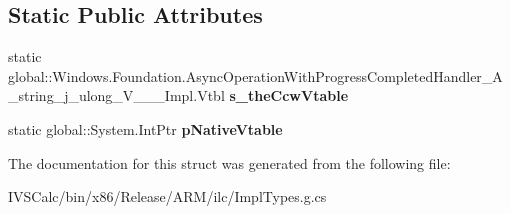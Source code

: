 \subsection*{Static Public Attributes}
\begin{DoxyCompactItemize}
\item 
\mbox{\label{struct_windows_1_1_foundation_1_1_async_operation_with_progress_completed_handler___a__string__j__ulong___v_______impl_1_1_vtbl_a6046ec4e0cf67387d4bfe825d541a234}} 
static global\+::\+Windows.\+Foundation.\+Async\+Operation\+With\+Progress\+Completed\+Handler\+\_\+\+A\+\_\+string\+\_\+j\+\_\+ulong\+\_\+\+V\+\_\+\+\_\+\+\_\+\+Impl.\+Vtbl {\bfseries s\+\_\+the\+Ccw\+Vtable}
\item 
\mbox{\label{struct_windows_1_1_foundation_1_1_async_operation_with_progress_completed_handler___a__string__j__ulong___v_______impl_1_1_vtbl_ab2050eadf0d3ed29b2588dca76139dc3}} 
static global\+::\+System.\+Int\+Ptr {\bfseries p\+Native\+Vtable}
\end{DoxyCompactItemize}


The documentation for this struct was generated from the following file\+:\begin{DoxyCompactItemize}
\item 
I\+V\+S\+Calc/bin/x86/\+Release/\+A\+R\+M/ilc/Impl\+Types.\+g.\+cs\end{DoxyCompactItemize}
